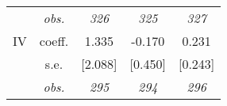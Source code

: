 \begin{table}[H]
\begin{centering}
\begin{tabular}{ r c ccc}
	 & \textit{obs.}	 & \textit{326}	 & \textit{325}	 & \textit{327}	\\
IV	 & coeff.	 & 1.335	 & -0.170	 & 0.231	\\
	 & s.e.	 & [2.088]	 & [0.450]	 & [0.243]	\\
	 & \textit{obs.}	 & \textit{295}	 & \textit{294}	 & \textit{296}	\\
\hline 
\end{tabular} 
\par\end{centering} 
\end{table}
